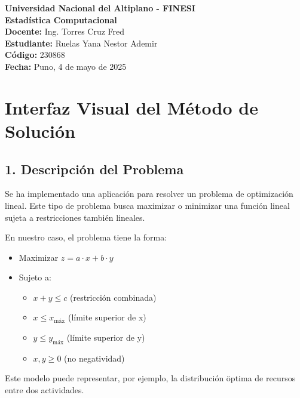 \documentclass[a4paper,10pt]{article}
\begin{document}
\begin{center}
    \textbf{\Large Universidad Nacional del Altiplano - FINESI} \\[1em]
    \textbf{\large Estadística Computacional} \\[1em]
    
    \textbf{Docente:} Ing. Torres Cruz Fred \\
    \textbf{Estudiante:} Ruelas Yana Nestor Ademir \\
    \textbf{Código:} 230868 \\[2em]
    
    \textbf{Fecha:} Puno, 4 de mayo de 2025
\end{center}

\vspace{1em} 


\section*{Interfaz Visual del M\'etodo de Soluci\'on}

\subsection*{1. Descripci\'on del Problema}
Se ha implementado una aplicaci\'on para resolver un problema de optimizaci\'on lineal. Este tipo de problema busca maximizar o minimizar una funci\'on lineal sujeta a restricciones tambi\'en lineales.

En nuestro caso, el problema tiene la forma:
\begin{itemize}
  \item Maximizar $z = a \cdot x + b \cdot y$
  \item Sujeto a:
  \begin{itemize}
    \item $x + y \leq c$ (restricci\'on combinada)
    \item $x \leq x_{\text{m\'ax}}$ (l\'imite superior de x)
    \item $y \leq y_{\text{m\'ax}}$ (l\'imite superior de y)
    \item $x, y \geq 0$ (no negatividad)
  \end{itemize}
\end{itemize}
Este modelo puede representar, por ejemplo, la distribuci\'on \"optima de recursos entre dos actividades.
\end{document}
